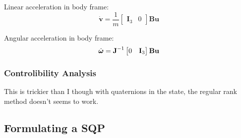 Linear acceleration in body frame:
\begin{equation}
    \dot{\textbf{v}} = \frac{1}{m}\begin{bmatrix}
        \textbf{I}_3 & 0
    \end{bmatrix} \textbf{B}\textbf{u}
\end{equation}

Angular acceleration in body frame:
\begin{equation}
    \dot{\text{\boldmath$\omega$}} = \textbf{J}^{-1}\begin{bmatrix}
        0 & \textbf{I}_3
    \end{bmatrix} \textbf{B}\textbf{u}
\end{equation}

\subsubsection{Controlibility Analysis}\cite{jiang2020controllability}
This is trickier than I though with quaternions in the state, the regular rank method doesn't seems to work.

\subsection{Formulating a SQP}


\pagebreak